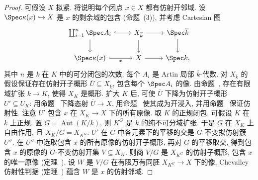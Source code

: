 \begin{proof}
可假设 $X$ 拟紧. 将说明每个闭点 $x\in X$ 都有仿射开邻域. 设 $\Spec\kappa(x)\hookrightarrow X$ 是 $x$ 的剩余域的包含 (命题~(3)), 并考虑 Cartesian 图
\[
\begin{tikzcd}
\coprod_{i=1}^n\Spec A_i\arrow[r,hook]\arrow[d]&X_{\overline k}\arrow[r]\arrow[d]&\Spec\overline k\arrow[d]\\
\Spec\kappa(x)\arrow[r,hook,"x"']&X\arrow[r]&\Spec k,
\end{tikzcd}
\]
其中 $n$ 是 $k$ 在 $K$ 中的可分闭包的次数, 每个 $A_i$ 是 Artin 局部 $\overline k$-代数. 对 $X_{\overline k}$ 的假设保证存在仿射开子概形 $\overline U\subseteq X_{\overline k}$, 包含每个 $\Spec A_i$ 的像. 由命题~, 存在有限域扩张 $k\to K$, 使得 $X_K$ 是概形. 扩大 $K$ 后, 可使 $\overline U$ 下降为仿射开子概形 $U'\subseteq U_K$: 用命题~ 下降态射 $\overline U\to X$, 用命题~ 使其成为开浸入, 并用命题~ 保证仿射性. 注意 $U'$ 包含 $x$ 在 $X_K\to X$ 下的所有原像. 取 $K$ 的正规闭包, 可假设 $K$ 在 $k$ 上正规. 置 $G=\operatorname{Aut}(K/k)$, 则 $K^G$ 是 $k$ 的纯不可分域扩张. 于是 $G$ 在 $X_K$ 上自由作用, 且 $X_K/G=X_{K^G}$. $U'$ 在 $G$ 中各元素下的平移的交是 $G$-不变拟仿射簇 $U''$. 在 $U''$ 中选取包含 $x$ 的所有原像的仿射开子概形, 再对 $G$ 的平移取交, 得到包含 $x$ 的原像的 $G$-不变仿射开集 $V\subseteq X_K$. 则商 $V/G$ 是 $X_{K^G}$ 的仿射子概形, 包含 $x$ 的唯一原像 (定理~). 设 $W$ 是 $V/G$ 在有限万有同胚 $X_{K^G}\to X$ 下的像, Chevalley 仿射性判据 (定理~) 蕴含 $W$ 是 $x$ 的仿射邻域.
\end{proof}

